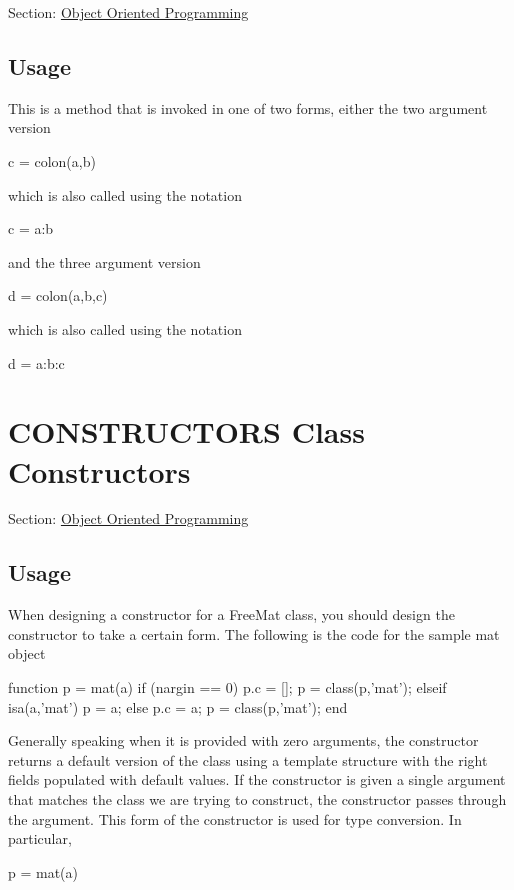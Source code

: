 Section\-: \hyperlink{sec_class}{Object Oriented Programming} \hypertarget{vtkwidgets_vtkxyplotwidget_Usage}{}\subsection{Usage}\label{vtkwidgets_vtkxyplotwidget_Usage}
This is a method that is invoked in one of two forms, either the two argument version \begin{DoxyVerb}  c = colon(a,b)
\end{DoxyVerb}
 which is also called using the notation \begin{DoxyVerb}  c = a:b
\end{DoxyVerb}
 and the three argument version \begin{DoxyVerb}  d = colon(a,b,c)
\end{DoxyVerb}
 which is also called using the notation \begin{DoxyVerb}  d = a:b:c
\end{DoxyVerb}
 \hypertarget{class_constructors}{}\section{C\-O\-N\-S\-T\-R\-U\-C\-T\-O\-R\-S Class Constructors}\label{class_constructors}
Section\-: \hyperlink{sec_class}{Object Oriented Programming} \hypertarget{vtkwidgets_vtkxyplotwidget_Usage}{}\subsection{Usage}\label{vtkwidgets_vtkxyplotwidget_Usage}
When designing a constructor for a Free\-Mat class, you should design the constructor to take a certain form. The following is the code for the sample {\ttfamily mat} object \begin{DoxyVerb}function p = mat(a)
  if (nargin == 0)
    p.c = [];
    p = class(p,'mat');
  elseif isa(a,'mat')
    p = a;
  else
    p.c = a;
    p = class(p,'mat');
  end
\end{DoxyVerb}
 Generally speaking when it is provided with zero arguments, the constructor returns a default version of the class using a template structure with the right fields populated with default values. If the constructor is given a single argument that matches the class we are trying to construct, the constructor passes through the argument. This form of the constructor is used for type conversion. In particular, \begin{DoxyVerb}   p = mat(a)
\end{DoxyVerb}
